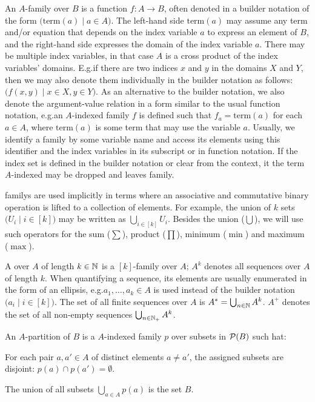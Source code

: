 \documentclass[../document.tex]{subfiles}
\begin{document}
    An \(A\)-\gls{family} over \(B\) is a function \(f\colon A \to B\), often  denoted in a builder notation of the form \(\big(\mathrm{term}(a) \mid a \in A\big)\).
    The left-hand side \(\mathrm{term}(a)\) may assume any term and/or equation that depends on the index variable \(a\) to express an element of \(B\), and the right-hand side expresses the domain of the index variable \(a\).
    There may be multiple index variables, in that case \(A\) is a cross product of the index variables' domains.
    E.g.\@ if there are two indices \(x\) and \(y\) in the domains \(X\) and \(Y\), then we may also denote them individually in the builder notation as follows: \(\big( f(x,y) \mid x \in X, y \in Y \big)\).
    As an alternative to the builder notation, we also denote the argument-value relation in a form similar to the usual function notation, e.g.\@ an \(A\)-indexed family \(f\) is defined such that \(f_a = \mathrm{term}(a)\) for each \(a \in A\), where \(\mathrm{term}(a)\) is some term that may use the variable \(a\).
    Usually, we identify a family by some variable name and access its elements using this identifier and the index variables in its subscript or in function notation.
    If the index set is defined in the builder notation or clear from the context, it the term \(A\)-indexed may be dropped and leaves family.

    \Glspl*{family} are used implicitly in terms where an associative and commutative binary operation is lifted to a collection of elements.
    For example, the union of \(k\) sets \(\big(U_i \mid i \in [k]\big)\) may be written as \(\bigcup_{i \in [k]} U_i\).
    Besides the union (\(\bigcup\)), we will use such operators for the sum (\(\sum\)), product (\(\prod\)), minimum (\(\min\)) and maximum (\(\max\)).

    A  over \(A\) of length \(k \in \mathbb{N}\) is a \([k]\)-\gls*{family} over \(A\); \(A^k\) denotes all sequences over \(A\) of length \(k\).
    When quantifying a sequence, its elements are usually enumerated in the form of an ellipsis, e.g.\@ \(a_1, \ldots, a_k \in A\) is used instead of the builder notation \(\big(a_i \mid i \in [k]\big)\).
    The set of all finite sequences over \(A\) is \(A^* = \bigcup_{n \in \mathbb{N}} A^k\).
    \(A^+\) denotes the set of all non-empty sequences \(\bigcup_{n \in \mathbb{N}_+} A^k\).

    An \(A\)-\gls{partition} of \(B\) is a \(A\)-indexed family \(p\) over subsets in \(\mathcal{P}(B)\) such hat:
    \begin{inparaenum}[(i)]
        \item For each pair \(a, a' \in A\) of distinct elements \(a \neq a'\), the assigned subsets are disjoint: \(p(a) \cap p(a') = \emptyset\).
        \item The union of all subsets \(\bigcup_{a \in A} p(a)\) is the set \(B\).
    \end{inparaenum}
\end{document}
